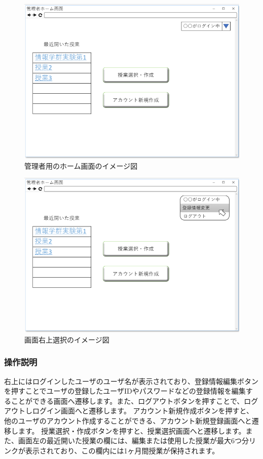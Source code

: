 \begin{figure}[phtbp]
  \begin{center}
    \includegraphics[width=1\linewidth,clip]{./img/04.png}
    \caption{管理者用のホーム画面のイメージ図}\label{fig:04}
  \end{center}
\end{figure}

\begin{figure}[phtbp]
  \begin{center}
    \includegraphics[width=1\linewidth,clip]{./img/05.png}
    \caption{画面右上選択のイメージ図}\label{fig:05}
  \end{center}
\end{figure}

\subsubsection{操作説明}
右上にはログインしたユーザのユーザ名が表示されており、登録情報編集ボタンを押すことでユーザの登録したユーザIDやパスワードなどの登録情報を編集することができる画面へ遷移します。また、ログアウトボタンを押すことで、ログアウトしログイン画面へと遷移します。
アカウント新規作成ボタンを押すと、他のユーザのアカウント作成することができる、アカウント新規登録画面へと遷移します。
授業選択・作成ボタンを押すと、授業選択画面へと遷移します。また、画面左の最近開いた授業の欄には、編集または使用した授業が最大6つ分リンクが表示されており、この欄内には1ヶ月間授業が保持されます。

